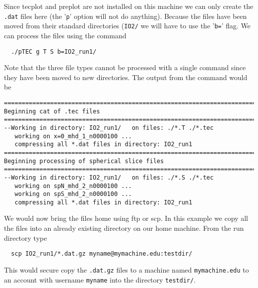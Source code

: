 Since tecplot and preplot are not installed on this machine we can
only create the {\tt .dat} files here (the '{\tt p}' option will not
do anything).  Because the files have been moved from their standard
directories ({\tt IO2/} we will have to use the '{\tt b=}' flag.  
We can process the files using the command
\begin{verbatim}
  ./pTEC g T S b=IO2_run1/
\end{verbatim}
Note that the three file types cannot be processed with a single command
since they have been moved to new directories.  The output from the 
command would be
\begin{verbatim}
========================================================================
Beginning cat of .tec files                                             
========================================================================
--Working in directory: IO2_run1/   on files: ./*.T ./*.tec
   working on x=0_mhd_1_n0000100 ...
   compressing all *.dat files in directory: IO2_run1
========================================================================
Beginning processing of spherical slice files                           
========================================================================
--Working in directory: IO2_run1/   on files: ./*.S ./*.tec
   working on spN_mhd_2_n0000100 ...
   working on spS_mhd_2_n0000100 ...
   compressing all *.dat files in directory: IO2_run1
\end{verbatim}
We would now bring the files home using ftp or scp.  In this example
we copy all the files into an already existing directory on our
home machine.  From the run directory type
\begin{verbatim}
  scp IO2_run1/*.dat.gz myname@mymachine.edu:testdir/
\end{verbatim}
This would secure copy the {\tt .dat.gz} files to 
a machine named {\tt mymachine.edu} to an account with username {\tt myname}
into the directory {\tt testdir/}.

